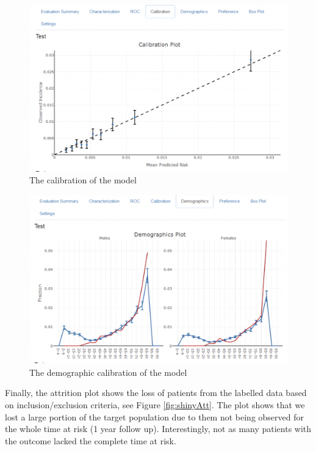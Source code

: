 \documentclass[11pt]{book}
\theoremstyle{definition}
\theoremstyle{definition}
\theoremstyle{definition}
\theoremstyle{remark}
\begin{document}
\begin{figure}

{\centering \includegraphics[width=0.8\linewidth]{images/PatientLevelPrediction/shiny/singleShiny/singleShinyCal} 

}

\caption{The calibration of the model}\label{fig:shinyCal}
\end{figure}

\begin{figure}

{\centering \includegraphics[width=0.8\linewidth]{images/PatientLevelPrediction/shiny/singleShiny/singleShinyDemo} 

}

\caption{The demographic calibration of the model}\label{fig:shinyDemo}
\end{figure}

Finally, the attrition plot shows the loss of patients from the labelled data based on inclusion/exclusion criteria, see Figure \ref{fig:shinyAtt}. The plot shows that we lost a large portion of the target population due to them not being observed for the whole time at risk (1 year follow up). Interestingly, not as many patients with the outcome lacked the complete time at risk.
\end{document}
